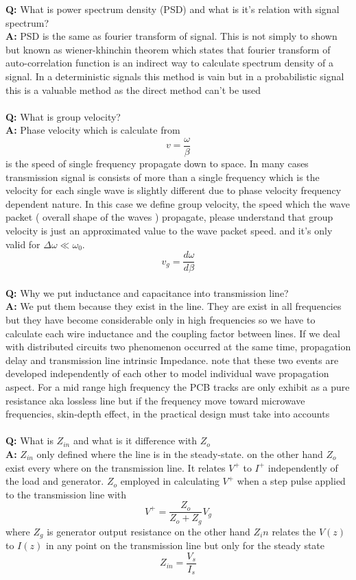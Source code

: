 \textbf{Q:} What is power spectrum density (PSD) and what is it's relation with signal spectrum?\\
\textbf{A:} PSD is the same as fourier transform of signal. This is not simply to shown but known as wiener-khinchin theorem which states that fourier transform of auto-correlation function is an indirect way to calculate spectrum density of a signal. In a deterministic signals this method is vain but in a probabilistic signal this is a valuable method as the direct method can't be used\\
\\\textbf{Q:} What is group velocity?\\
\textbf{A:} Phase velocity which is calculate from\\
$$ v = \frac{\omega}{\beta} $$
is the speed of single frequency propagate down to space. In many cases transmission signal is consists of more than a single frequency which is the velocity for each single wave is slightly different due to phase velocity frequency dependent nature. In this case we define group velocity, the speed which the wave packet ( overall shape of the waves ) propagate, please understand that group velocity is just an approximated value to the wave packet speed. and it's only valid for $\Delta \omega \ll \omega_{0}$.\\
$$ v_g = \frac{d\omega}{d\beta} $$
\\\textbf{Q:} Why we put inductance and capacitance into transmission line?\\
\textbf{A:} We put them because they exist in the line. They are exist in all frequencies but they have become considerable only in high frequencies so we have to calculate each wire inductance and the coupling factor between lines. If we deal with distributed circuits two phenomenon occurred at the same time, propagation delay and transmission line intrinsic Impedance. note that these two events are developed independently of each other to model individual wave propagation aspect.
For a mid range high frequency the PCB tracks are only exhibit as a pure resistance aka lossless line but if the frequency move toward microwave frequencies, skin-depth effect, in the practical design must take into accounts
\\\\\textbf{Q:} What is $Z_{in}$ and what is it difference with $Z_o$\\
\textbf{A:} $Z_{in}$ only defined where the line is in the steady-state. on the other hand $Z_o$ exist every where on the transmission line. It relates $V^+$ to $I^+$ independently of the load and generator. $Z_o$ employed in calculating $V^+$ when a step pulse applied to the transmission line with\\
$$ V^+ = \frac{Z_o}{Z_o + Z_g} V_g $$
where $Z_g$ is generator output resistance
on the other hand $Z_in$ relates the $V(z)$ to $I(z)$ in any point on the transmission line but only for the steady state\\
$$ Z_{in} = \frac{V_s}{I_s} $$
